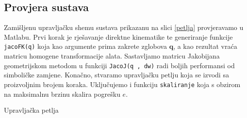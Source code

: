 \documentclass[times, utf8, diplomski, numeric]{fer}
\begin{document}
\subsection{Provjera sustava}\label{provjera}
Zamišljenu upravljačku shemu sustava prikazanu na slici \ref{petlja} provjeravamo u Matlabu.
Prvi korak je rješavanje direktne kinematike te generiranje funkcije \texttt{jacoFK(q)} koja kao argumente prima zakrete zglobova $\mathbf{q}$,
a kao rezultat vraća matricu homogene transformacije alata.
Sastavljamo matricu Jakobijana geometrijskom metodom u funkciji \texttt{JacoJ(q , dw)} radi boljih performansi od simboličke zamjene.
Konačno, stvaramo upravljačku petlju koja se izvodi sa proizvoljnim brojem koraka.  Uključujemo i funkciju \texttt{skaliranje} koja s obzirom na maksimalnu brzinu skalira pogrešku $e$.
\begin{algorithm}[H]
\caption{Upravljačka petlja}
\begin{algorithmic}
\ENDFOR
\end{algorithmic}
\end{algorithm}
\end{document}
